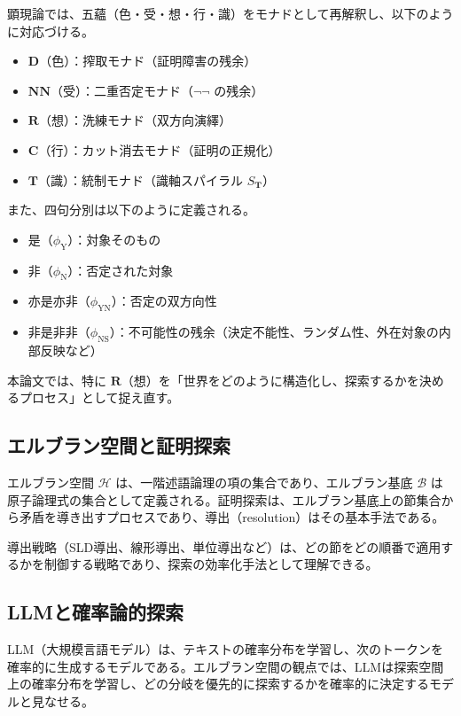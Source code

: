 \documentclass[11pt,a4paper]{ltjsarticle}
\theoremstyle{definition}
\newcommand{\Md}{\mathbf{D}}
\newcommand{\Mnn}{\mathbf{NN}}
\newcommand{\Mr}{\mathbf{R}}
\newcommand{\MC}{\mathbf{C}}
\newcommand{\MT}{\mathbf{T}}
\newcommand{\phiY}{\phi_{\text{Y}}}
\newcommand{\phiN}{\phi_{\text{N}}}
\newcommand{\phiYN}{\phi_{\text{YN}}}
\newcommand{\phiNS}{\phi_{\text{NS}}}
\newcommand{\Herbrand}{\mathcal{H}}
\newcommand{\Herbase}{\mathcal{B}}
\begin{document}
顕現論では、五蘊（色・受・想・行・識）をモナドとして再解釈し、以下のように対応づける\cite{icat}。

\begin{itemize}
\item $\Md$（色）：搾取モナド（証明障害の残余）
\item $\Mnn$（受）：二重否定モナド（$\neg\neg$ の残余）
\item $\Mr$（想）：洗練モナド（双方向演繹）
\item $\MC$（行）：カット消去モナド（証明の正規化）
\item $\MT$（識）：統制モナド（識軸スパイラル $S_{\MT}$）
\end{itemize}

また、四句分別は以下のように定義される\cite{icat}。

\begin{itemize}
\item 是（$\phiY$）：対象そのもの
\item 非（$\phiN$）：否定された対象
\item 亦是亦非（$\phiYN$）：否定の双方向性
\item 非是非非（$\phiNS$）：不可能性の残余（決定不能性、ランダム性、外在対象の内部反映など）
\end{itemize}

本論文では、特に $\Mr$（想）を「世界をどのように構造化し、探索するかを決めるプロセス」として捉え直す。

\subsection{エルブラン空間と証明探索}

エルブラン空間 $\Herbrand$ は、一階述語論理の項の集合であり、エルブラン基底 $\Herbase$ は原子論理式の集合として定義される\cite{herbrand}。証明探索は、エルブラン基底上の節集合から矛盾を導き出すプロセスであり、導出（resolution）はその基本手法である\cite{resolution}。

導出戦略（SLD導出、線形導出、単位導出など）は、どの節をどの順番で適用するかを制御する戦略であり、探索の効率化手法として理解できる\cite{resolution}。

\subsection{LLMと確率論的探索}

LLM（大規模言語モデル）は、テキストの確率分布を学習し、次のトークンを確率的に生成するモデルである\cite{llm}。エルブラン空間の観点では、LLMは探索空間上の確率分布を学習し、どの分岐を優先的に探索するかを確率的に決定するモデルと見なせる。
\end{document}
